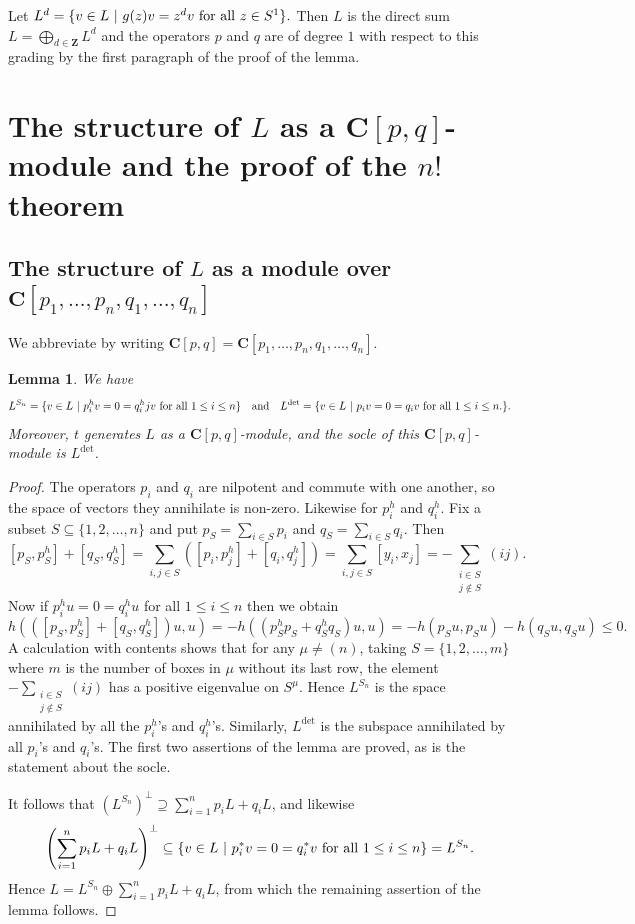 \documentclass[12pt, reqno]{amsart}
\numberwithin{equation}{section}
\theoremstyle{definition}
\theoremstyle{plain}
\newtheorem{lemma}[theorem]{Lemma}
\newcommand{\CC}{\mathbf{C}}
\newcommand{\ZZ}{\mathbf{Z}}
\begin{document}
Let $L^{d}=\{v \in L \ | \ g(z)v=z^d v \ \hbox{for all $z \in S^1$}\}.$ Then $L$ is the direct sum $L=\bigoplus_{d \in \ZZ} L^d$ and the operators $p$ and $q$ are of degree $1$ with respect to this grading by the first paragraph of the proof of the lemma. 

\section{The structure of $L$ as a $\CC[p,q]$-module and the proof of the $n!$ theorem}

\subsection{The structure of $L$ as a module over $\CC[p_1,\dots,p_n,q_1,\dots,q_n]$}

We abbreviate by writing $\CC[p,q]=\CC[p_1,\dots,p_n,q_1,\dots,q_n]$.

\begin{lemma}
We have
$$L^{S_n}=\{v \in L \ | \ p_i^hv=0=q_i^hjv \ \hbox{for all $1 \leq i \leq n$} \} \quad \text{and} \quad L^\mathrm{det}=\{v \in L \ | \ p_i v=0=q_i v \ \hbox{for all $1 \leq i \leq n$.} \}.$$ Moreover, $t$ generates $L$ as a $\CC[p,q]$-module, and the socle of this $\CC[p,q]$-module is $L^\mathrm{det}$.
\end{lemma} 
\begin{proof}
The operators $p_i$ and $q_i$ are nilpotent and commute with one another, so the space of vectors they annihilate is non-zero. Likewise for $p_i^h$ and $q_i^h$. Fix a subset $S \subseteq \{1,2,\dots,n \}$ and put $p_S=\sum_{i \in S} p_i$ and $q_S=\sum_{i \in S} q_i$. Then $$[p_S,p_S^h]+[q_S,q_S^h]=\sum_{i,j \in S}  ([p_i,p_j^h]+[q_i,q_j^h])=\sum_{ i,j \in S} [y_i,x_j]=-\sum_{\substack{i \in S \\ j \notin S}} (ij).$$ Now if $p_i^hu=0=q_i^hu$ for all $1 \leq i \leq n$ then we obtain
$$h(([p_S,p_S^h]+[q_S,q_S^h])u,u)=-h((p_S^h p_S+q_S^h q_S )u,u)=-h(p_S u,p_S u)-h(q_S u,q_S u) \leq 0.$$ A calculation with contents shows that for any $\mu \neq (n)$, taking $S=\{1,2,\dots,m\}$ where $m$ is the number of boxes in $\mu$ without its last row, the element $-\sum_{\substack{i \in S \\ j \notin S}} (ij)$ has a positive eigenvalue on $S^\mu$. Hence $L^{S_n}$ is the space annihilated by all the $p_i^h$'s and $q_i^h$'s. Similarly, $L^{\mathrm{det}}$ is the subspace annihilated by all $p_i$'s and $q_i$'s. The first two assertions of the lemma are proved, as is the statement about the socle.

It follows that $(L^{S_n})^\perp \supseteq \sum_{i=1}^n p_i L + q_i L$, and likewise $$\left(\sum_{i=1}^n p_i L + q_i L \right)^\perp \subseteq  \{v \in L \ | \ p_i^*v=0=q_i^*v \ \hbox{for all $1 \leq i \leq n$} \}=L^{S_n}.$$ Hence $L=L^{S_n} \oplus \sum_{i=1}^n p_i L + q_i L$, from which the remaining assertion of the lemma follows.
\end{proof}
\end{document}
